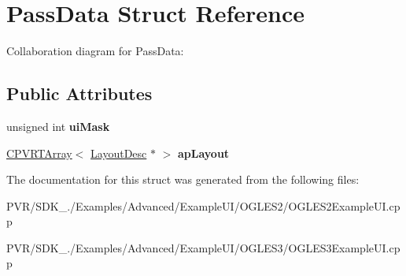 \hypertarget{struct_pass_data}{\section{Pass\+Data Struct Reference}
\label{struct_pass_data}
}


Collaboration diagram for Pass\+Data\+:
\subsection*{Public Attributes}
\begin{DoxyCompactItemize}
\item 
\hypertarget{struct_pass_data_aa68cff3b80caee6f34dfc3d1dec570c0}{unsigned int {\bfseries ui\+Mask}}\label{struct_pass_data_aa68cff3b80caee6f34dfc3d1dec570c0}

\item 
\hypertarget{struct_pass_data_a83300ed203a64da90204999aad795158}{\hyperlink{class_c_p_v_r_t_array}{C\+P\+V\+R\+T\+Array}$<$ \hyperlink{struct_layout_desc}{Layout\+Desc} $\ast$ $>$ {\bfseries ap\+Layout}}\label{struct_pass_data_a83300ed203a64da90204999aad795158}

\end{DoxyCompactItemize}


The documentation for this struct was generated from the following files\+:\begin{DoxyCompactItemize}
\item 
P\+V\+R/\+S\+D\+K\+\_./\+Examples/\+Advanced/\+Example\+U\+I/\+O\+G\+L\+E\+S2/O\+G\+L\+E\+S2\+Example\+U\+I.\+cpp\item 
P\+V\+R/\+S\+D\+K\+\_./\+Examples/\+Advanced/\+Example\+U\+I/\+O\+G\+L\+E\+S3/O\+G\+L\+E\+S3\+Example\+U\+I.\+cpp\end{DoxyCompactItemize}
